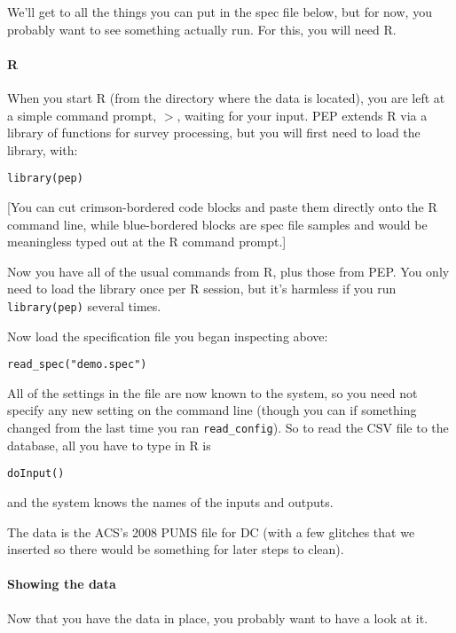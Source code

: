 \documentclass{article}
\begin{document}
We'll get to all the things you can put in the spec file below, but for now,
you probably want to see something actually run. For this, you will need R. 

\paragraph{R} 
When you start R (from the directory where the data is located), you are left at a
simple command prompt, $>$, waiting for your input. PEP extends R via a library of
functions for survey processing, but you will first need to load the library, with:
\begin{rcode} 
\begin{verbatim}
library(pep)
\end{verbatim}
\end{rcode} 

[You can cut crimson-bordered code blocks and paste them directly onto the R
command line, while blue-bordered blocks are spec file samples and 
would be meaningless typed out at the R command prompt.]

Now you have all of the usual commands from R, plus those from PEP. You only
need to load the library once per R session, but it's harmless if you run 
{\tt library(pep)} several times.

Now load the specification file you began inspecting above:
\begin{rcode} 
\begin{verbatim}
read_spec("demo.spec")
\end{verbatim}
\end{rcode} 

All of the settings in the file are now known to the system, so you need not specify any
new setting on the command line (though you can if something changed from the last time
you ran {\tt read\_config}). So to read the CSV file to the database, all you have to type
in R is
\begin{rcode} 
\begin{verbatim}
doInput()
\end{verbatim}
\end{rcode} 
and the system knows the names of the inputs and outputs.

The data is the ACS's 2008 PUMS file for DC (with a few glitches that we inserted so
there would be something for later steps to clean). 


\paragraph{Showing the data}
Now that you have the data in place, you probably want to have a look at it.
\end{document}
